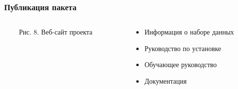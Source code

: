 \begin{frame}[fragile]
	\transwipe[direction=90]
	\frametitle{\faCloudUpload\ Публикация пакета}
	
	\begin{columns}
        \begin{column}{0.75\textwidth}
            \begin{figure}[h]{\textwidth}
        		\centering
        		\caption*{Рис. 8. Веб-сайт проекта} \label{fig:website}
        	\end{figure}
        \end{column}

        \begin{column}{0.25\textwidth}
            \begin{itemize} 
        	    \item[\bullet] Информация о наборе данных
        	    \item[\bullet] Руководство по установке
        	    \item[\bullet] Обучающее руководство
        	    \item[\bullet] Документация
            \end{itemize}
        \end{column}
    \end{columns}
\end{frame}
